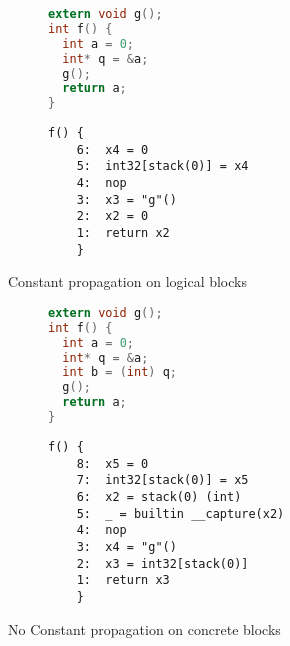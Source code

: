 \label{sec:eval}
\begin{figure}
\begin{subfigure}{.48\textwidth}
  \begin{lstlisting}[language=C,basicstyle=\small]
extern void g();
int f() {
  int a = 0;
  int* q = &a;
  g();
  return a;
}
\end{lstlisting}
\end{subfigure}
\begin{subfigure}{.48\textwidth}
  \begin{lstlisting}[basicstyle=\small]
f() {
    6:	x4 = 0
    5:	int32[stack(0)] = x4
    4:	nop
    3:	x3 = "g"()
    2:	x2 = 0
    1:	return x2
    }
\end{lstlisting}
\end{subfigure}
\caption{Constant propagation on logical blocks}
\label{fig:cplogical}
\end{figure}
\begin{figure}
\begin{subfigure}{.48\textwidth}
  \begin{lstlisting}[language=C,basicstyle=\small]
extern void g();
int f() {
  int a = 0;
  int* q = &a;
  int b = (int) q;
  g();
  return a;
}
\end{lstlisting}
\end{subfigure}
\begin{subfigure}{.48\textwidth}
  \begin{lstlisting}[basicstyle=\small]
f() {
    8:	x5 = 0
    7:	int32[stack(0)] = x5
    6:	x2 = stack(0) (int)
    5:	_ = builtin __capture(x2)
    4:	nop
    3:	x4 = "g"()
    2:	x3 = int32[stack(0)]
    1:	return x3
    }
\end{lstlisting}
\end{subfigure}
\caption{No Constant propagation on concrete blocks}
\label{fig:cpconcrete}
\end{figure}
